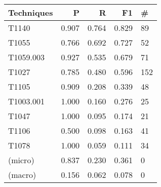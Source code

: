 \begin{tabular}{lrrrl}
\toprule
Techniques & P & R & F1 & \# \\
\midrule
T1140 & 0.907 & 0.764 & 0.829 & 89 \\
T1055 & 0.766 & 0.692 & 0.727 & 52 \\
T1059.003 & 0.927 & 0.535 & 0.679 & 71 \\
T1027 & 0.785 & 0.480 & 0.596 & 152 \\
T1105 & 0.909 & 0.208 & 0.339 & 48 \\
T1003.001 & 1.000 & 0.160 & 0.276 & 25 \\
T1047 & 1.000 & 0.095 & 0.174 & 21 \\
T1106 & 0.500 & 0.098 & 0.163 & 41 \\
T1078 & 1.000 & 0.059 & 0.111 & 34 \\
(micro) & 0.837 & 0.230 & 0.361 & 0 \\
(macro) & 0.156 & 0.062 & 0.078 & 0 \\
\bottomrule
\end{tabular}
